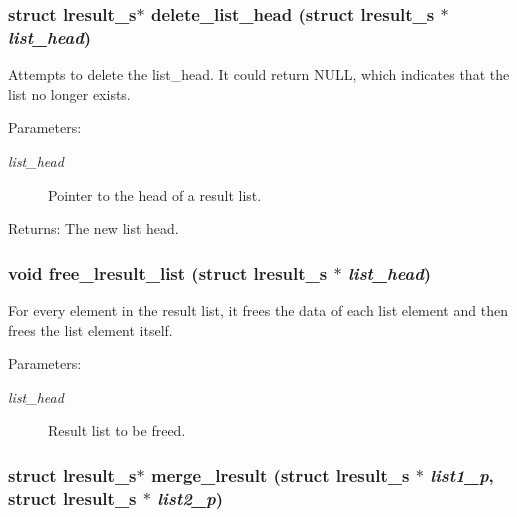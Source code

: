 \subsubsection{\setlength{\rightskip}{0pt plus 5cm}struct \bf{lresult\_\-s}$\ast$ delete\_\-list\_\-head (struct \bf{lresult\_\-s} $\ast$ {\em list\_\-head})}\label{llist_8h_7cb05d5f6c11bd2b8b7ff00c9167d5a7}


Attempts to delete the list\_\-head. It could return NULL, which indicates that the list no longer exists.

\begin{Desc}
\item[Parameters:]
\begin{description}
\item[{\em list\_\-head}]Pointer to the head of a result list. \end{description}
\end{Desc}
\begin{Desc}
\item[Returns:]The new list head. \end{Desc}
\subsubsection{\setlength{\rightskip}{0pt plus 5cm}void free\_\-lresult\_\-list (struct \bf{lresult\_\-s} $\ast$ {\em list\_\-head})}\label{llist_8h_9ccdd6220d51b5f2de19c0b94cd13223}


For every element in the result list, it frees the data of each list element and then frees the list element itself.

\begin{Desc}
\item[Parameters:]
\begin{description}
\item[{\em list\_\-head}]Result list to be freed. \end{description}
\end{Desc}
\subsubsection{\setlength{\rightskip}{0pt plus 5cm}struct \bf{lresult\_\-s}$\ast$ merge\_\-lresult (struct \bf{lresult\_\-s} $\ast$ {\em list1\_\-p}, struct \bf{lresult\_\-s} $\ast$ {\em list2\_\-p})}\label{llist_8h_728f7e25f4f7dc970864ef9705192840}


